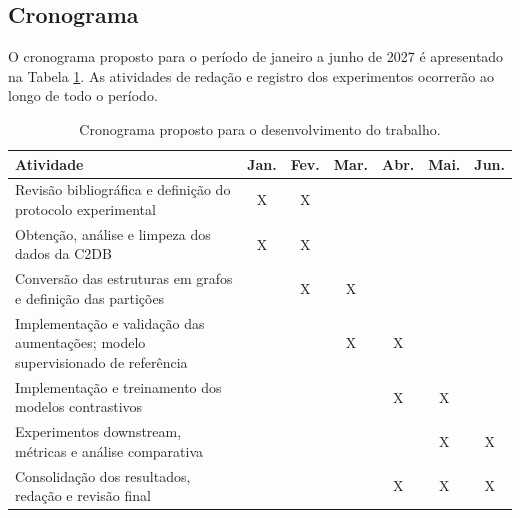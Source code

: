 \subsection{Cronograma}

O cronograma proposto para o período de janeiro a junho de 2027 é apresentado na Tabela \ref{tab:cronograma}. As atividades de redação e registro dos experimentos ocorrerão ao longo de todo o período.

\begin{table}[htbp]
    \centering
    \caption{Cronograma proposto para o desenvolvimento do trabalho.}
    \label{tab:cronograma}
    \small
    \begin{tabular}{|p{7.1cm}|c|c|c|c|c|c|}
        \hline
        \textbf{Atividade} & \textbf{Jan.} & \textbf{Fev.} & \textbf{Mar.} & \textbf{Abr.} & \textbf{Mai.} & \textbf{Jun.} \\
        \hline
        Revisão bibliográfica e definição do protocolo experimental & X & X & & & & \\
        \hline
        Obtenção, análise e limpeza dos dados da C2DB & X & X & & & & \\
        \hline
        Conversão das estruturas em grafos e definição das partições & & X & X & & & \\
        \hline
        Implementação e validação das aumentações; modelo supervisionado de referência & & & X & X & & \\
        \hline
        Implementação e treinamento dos modelos contrastivos & & & & X & X & \\
        \hline
        Experimentos downstream, métricas e análise comparativa & & & & & X & X \\
        \hline
        Consolidação dos resultados, redação e revisão final & & & & X & X & X \\
        \hline
    \end{tabular}
\end{table}

